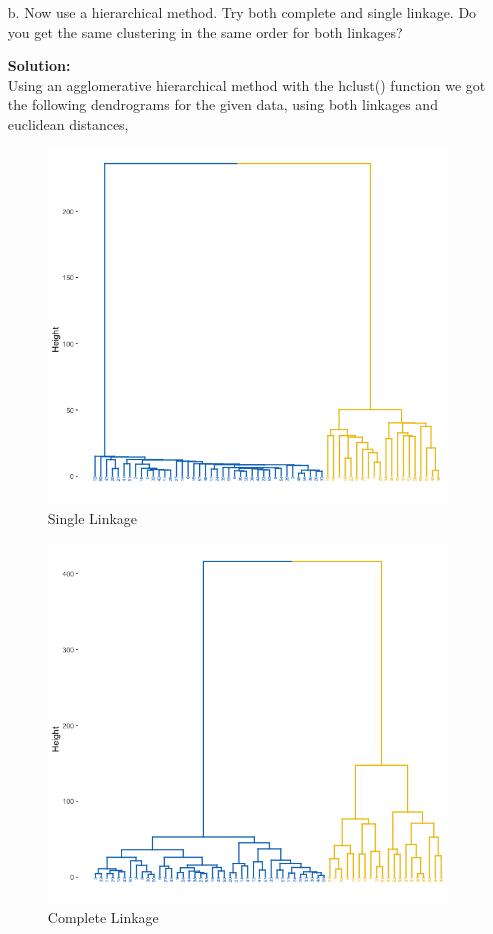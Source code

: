 \documentclass[12pt]{article}
\makeatletter
\theoremstyle{homework}
\newenvironment{exercise}[1]
{\def\@currentlabel{#1}\exercisecore}
{\endexercisecore}
\newcommand{\localhead}[1]{\par\smallskip\noindent\textbf{#1}\nobreak\\}%
\newcommand\solution{\localhead{Solution:}}
\makeatother
\begin{document}
\begin{exercise}{1}
\begin{enumerate}
      \item[b.] Now use a hierarchical method. Try both complete and single linkage. Do you get the same clustering in the same order for both linkages?\\
      \solution Using an agglomerative hierarchical method with the hclust() function we got the following dendrograms for the given data, using both linkages and euclidean distances,
      \begin{figure}[H]
        \begin{center}
          \caption{Single Linkage}
        \includegraphics[width = .70\textwidth]{Rplot.png}
        \end{center}
      \end{figure}
      \begin{figure}[H]
        \begin{center}
          \caption{Complete Linkage}
        \includegraphics[width = .70\textwidth]{Rplot02.png}
        \end{center}

\end{figure}
\end{enumerate}
\end{exercise}
\end{document}
